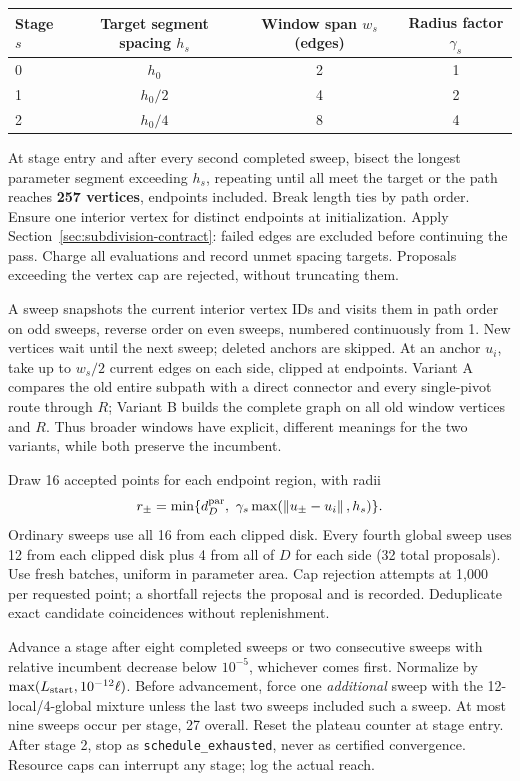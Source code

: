 \documentclass[11pt,letterpaper]{article}
\newcommand{\norm}[1]{\left\lVert#1\right\rVert}
\newcommand{\src}[1]{\nolinkurl{#1}}
\begin{document}
\begin{center}
\begin{tabular}{@{}lccc@{}}
\toprule
Stage $s$ & Target segment spacing $h_s$ & Window span $w_s$ (edges) & Radius factor $\gamma_s$\\
\midrule
0 & $h_0$ & 2 & 1\\
1 & $h_0/2$ & 4 & 2\\
2 & $h_0/4$ & 8 & 4\\
\bottomrule
\end{tabular}
\end{center}
At stage entry and after every second completed sweep, bisect the longest parameter segment exceeding $h_s$, repeating until all meet the target or the path reaches \textbf{257 vertices}, endpoints included. Break length ties by path order. Ensure one interior vertex for distinct endpoints at initialization. Apply Section~\ref{sec:subdivision-contract}: failed edges are excluded before continuing the pass. Charge all evaluations and record unmet spacing targets. Proposals exceeding the vertex cap are rejected, without truncating them.

A sweep snapshots the current interior vertex IDs and visits them in path order on odd sweeps, reverse order on even sweeps, numbered continuously from 1. New vertices wait until the next sweep; deleted anchors are skipped. At an anchor $u_i$, take up to $w_s/2$ current edges on each side, clipped at endpoints. Variant A compares the old entire subpath with a direct connector and every single-pivot route through $R$; Variant B builds the complete graph on all old window vertices and $R$. Thus broader windows have explicit, different meanings for the two variants, while both preserve the incumbent.

Draw 16 accepted points for each endpoint region, with radii
\[
 r_\pm=\min\{d_D^{\rm par},\ \gamma_s\max(\norm{u_\pm-u_i},h_s)\}.
\]
Ordinary sweeps use all 16 from each clipped disk. Every fourth global sweep uses 12 from each clipped disk plus 4 from all of $D$ for each side (32 total proposals). Use fresh batches, uniform in parameter area. Cap rejection attempts at 1,000 per requested point; a shortfall rejects the proposal and is recorded. Deduplicate exact candidate coincidences without replenishment.

Advance a stage after eight completed sweeps or two consecutive sweeps with relative incumbent decrease below $10^{-5}$, whichever comes first. Normalize by $\max(L_{\rm start},10^{-12}\ell)$. Before advancement, force one \emph{additional} sweep with the 12-local/4-global mixture unless the last two sweeps included such a sweep. At most nine sweeps occur per stage, 27 overall. Reset the plateau counter at stage entry. After stage 2, stop as \src{schedule_exhausted}, never as certified convergence. Resource caps can interrupt any stage; log the actual reach.
\end{document}
